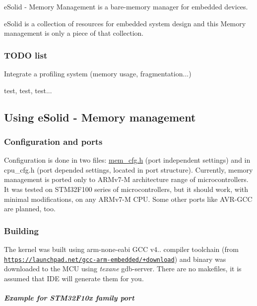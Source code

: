 e\-Solid -\/ Memory Management is a bare-\/memory manager for embedded devices.

e\-Solid is a collection of resources for embedded system design and this Memory management is only a piece of that collection.

\subsubsection*{T\-O\-D\-O list}


\begin{DoxyItemize}
\item Integrate a profiling system (memory usage, fragmentation...)
\item test, test, test...
\end{DoxyItemize}

\subsection*{Using e\-Solid -\/ Memory management}

\subsubsection*{Configuration and ports}

Configuration is done in two files\-: {\ttfamily \hyperlink{mem__cfg_8h}{mem\-\_\-cfg.\-h}} (port independent settings) and in {\ttfamily cpu\-\_\-cfg.\-h} (port depended settings, located in port structure). Currently, memory management is ported only to A\-R\-Mv7-\/\-M architecture range of microcontrollers. It was tested on S\-T\-M32\-F100 series of microcontrollers, but it should work, with minimal modifications, on any A\-R\-Mv7-\/\-M C\-P\-U. Some other ports like A\-V\-R-\/\-G\-C\-C are planned, too.

\subsubsection*{Building}

The kernel was built using arm-\/none-\/eabi G\-C\-C v4.. compiler toolchain (from \href{https://launchpad.net/gcc-arm-embedded/+download}{\tt https\-://launchpad.\-net/gcc-\/arm-\/embedded/+download}) and binary was downloaded to the M\-C\-U using {\itshape texane} gdb-\/server. There are no makefiles, it is assumed that I\-D\-E will generate them for you.

\subparagraph*{Example for S\-T\-M32\-F10x family port}


